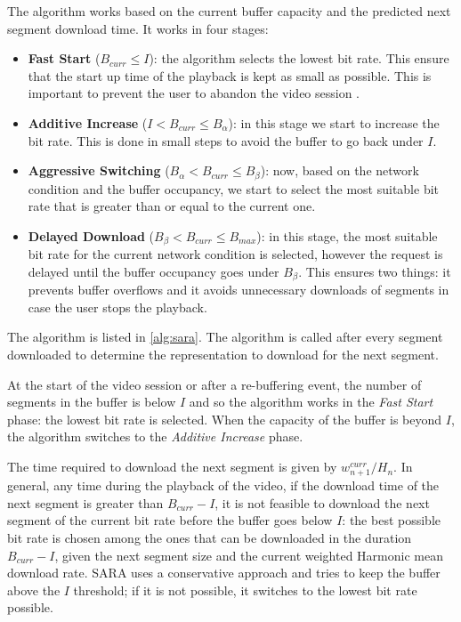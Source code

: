 \documentclass[openany]{book}
\begin{document}
The algorithm works based on the current buffer capacity and the predicted next segment download time. It works in four stages:
\begin{itemize}
\item \textbf{Fast Start} ($B_{curr} \leq I$): the algorithm selects the lowest bit rate. This ensure that the start up time of the playback is kept as small as possible. This is important to prevent the user to abandon the video session \cite{QoEDASH}.
\item \textbf{Additive Increase} ($ I < B_{curr} \leq B_{\alpha}$): in this stage we start to increase the bit rate. This is done in small steps to avoid the buffer to go back under $I$.
\item \textbf{Aggressive Switching} ($ B_{\alpha} < B_{curr} \leq B_{\beta}$): now, based on the network condition and the buffer occupancy, we start to select the most suitable bit rate that is greater than or equal to the current one. 
\item \textbf{Delayed Download} ($B_{\beta} < B_{curr} \leq B_{max}$): in this stage, the most suitable bit rate for the current network condition is selected, however the request is delayed until the buffer occupancy goes under $B_{\beta}$. This ensures two things: it prevents buffer overflows and it avoids unnecessary downloads of segments in case the user stops the playback. 
\end{itemize}

The algorithm is listed in \ref{alg:sara}. The algorithm is called after every segment downloaded to determine the representation to download for the next segment.

At the start of the video session or after a re-buffering event, the number of segments in the buffer is below $I$ and so the algorithm works in the \textit{Fast Start} phase: the lowest bit rate is selected. When the capacity of the buffer is beyond $I$, the algorithm switches to the \textit{Additive Increase} phase.

The time required to download the next segment is given by $w_{n+1}^{curr}/H_n$. In general, any time during the playback of the video, if the download time of the next segment is greater than $B_{curr}-I$, it is not feasible to download the next segment of the current bit rate before the buffer goes below $I$: the best possible bit rate is chosen among the ones that can be downloaded in the duration $B_{curr}-I$, given the next segment size and the current weighted Harmonic mean download rate. SARA uses a conservative approach and tries to keep the buffer above the $I$ threshold; if it is not possible, it switches to the lowest bit rate possible.
\end{document}
